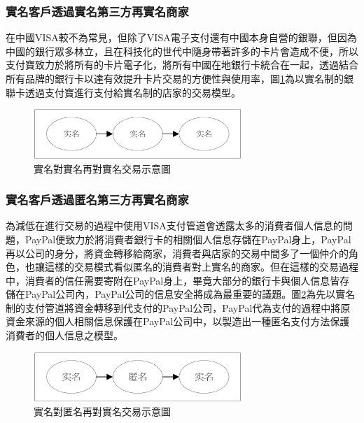 		\subsubsection{實名客戶透過實名第三方再實名商家}
		在中國VISA較不為常見，但除了VISA電子支付還有中國本身自營的銀聯，但因為中國的銀行眾多林立，且在科技化的世代中隨身帶著許多的卡片會造成不便，所以支付寶致力於將所有的卡片電子化，將所有中國在地銀行卡統合在一起，透過結合所有品牌的銀行卡以達有效提升卡片交易的方便性與使用率，圖\ref{modennn}為以實名制的銀聯卡透過支付寶進行支付給實名制的店家的交易模型。

		\begin{figure}[h]
			\centering
			\includegraphics[width = 0.7\textwidth]{modennn.png}
			\caption{實名對實名再對實名交易示意圖}\label{modennn}
		\end{figure}

		\subsubsection{實名客戶透過匿名第三方再實名商家}
		為減低在進行交易的過程中使用VISA支付管道會透露太多的消費者個人信息的問題，PayPal便致力於將消費者銀行卡的相關個人信息存儲在PayPal身上，PayPal再以公司的身分，將資金轉移給商家，消費者與店家的交易中間多了一個仲介的角色，也讓這樣的交易模式看似匿名的消費者對上實名的商家。但在這樣的交易過程中，消費者的信任需要寄附在PayPal身上，畢竟大部分的銀行卡與個人信息皆存儲在PayPal公司內，PayPal公司的信息安全將成為最重要的議題。圖\ref{modenan}為先以實名制的支付管道將資金轉移到代支付的PayPal公司，PayPal代為支付的過程中將原資金來源的個人相關信息保護在PayPal公司中，以製造出一種匿名支付方法保護消費者的個人信息之模型。

		\begin{figure}[h]
			\centering
			\includegraphics[width = 0.7\textwidth]{modenan.png}
			\caption{實名對匿名再對實名交易示意圖}\label{modenan}
		\end{figure}

